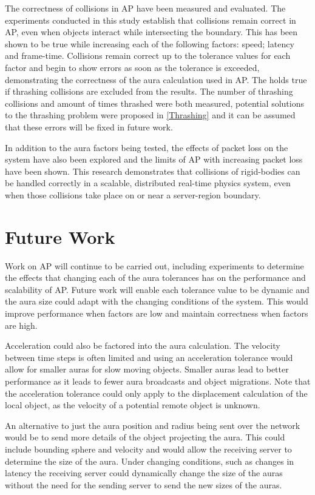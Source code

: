 The correctness of collisions in AP have been measured and evaluated. The experiments conducted in this study establish that collisions remain correct in AP, even when objects interact while intersecting the boundary. This has been shown to be true while increasing each of the following factors: speed; latency and frame-time. Collisions remain correct up to the tolerance values for each factor and begin to show errors as soon as the tolerance is exceeded, demonstrating the correctness of the aura calculation used in AP. The holds true if thrashing collisions are excluded from the results. The number of thrashing collisions and amount of times thrashed were both measured, potential solutions to the thrashing problem were proposed in \ref{Thrashing} and it can be assumed that these errors will be fixed in future work.

In addition to the aura factors being tested, the effects of packet loss on the system have also been explored and the limits of AP with increasing packet loss have been shown. This research demonstrates that collisions of rigid-bodies can be handled correctly in a scalable, distributed real-time physics system, even when those collisions take place on or near a server-region boundary.

\section{Future Work}
Work on AP will continue to be carried out, including experiments to determine the effects that changing each of the aura tolerances has on the performance and scalability of AP. Future work will enable each tolerance value to be dynamic and the aura size could adapt with the changing conditions of the system. This would improve performance when factors are low and maintain correctness when factors are high.

Acceleration could also be factored into the aura calculation. The velocity between time steps is often limited and using an acceleration tolerance would allow for smaller auras for slow moving objects. Smaller auras lead to better performance as it leads to fewer aura broadcasts and object migrations. Note that the acceleration tolerance could only apply to the displacement calculation of the local object, as the velocity of a potential remote object is unknown.

An alternative to just the aura position and radius being sent over the network would be to send more details of the object projecting the aura. This could include bounding sphere and velocity and would allow the receiving server to determine the size of the aura. Under changing conditions, such as changes in latency the receiving server could dynamically change the size of the auras without the need for the sending server to send the new sizes of the auras.

